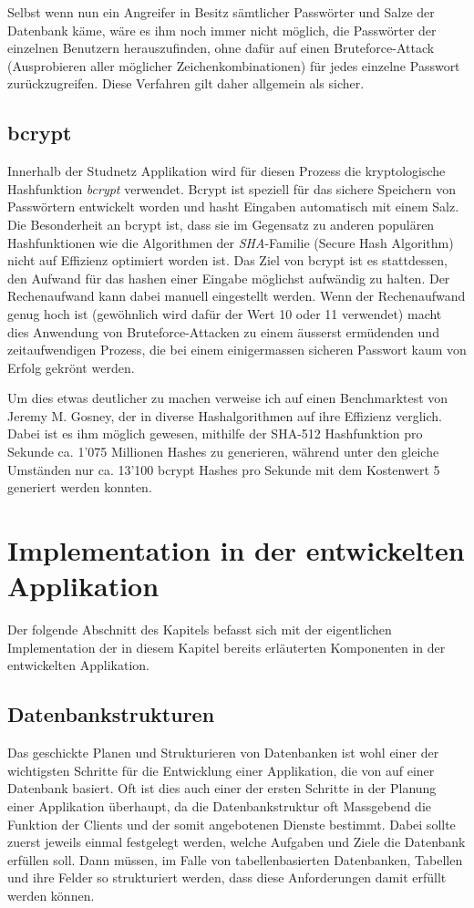 \documentclass[../main.tex]{subfiles}
\begin{document}
	Selbst wenn nun ein Angreifer in Besitz sämtlicher Passwörter und Salze der Datenbank käme, wäre es ihm noch immer nicht möglich, die Passwörter der einzelnen Benutzern herauszufinden, ohne dafür auf einen Bruteforce-Attack (Ausprobieren aller möglicher Zeichenkombinationen) für jedes einzelne Passwort zurückzugreifen. Diese Verfahren gilt daher allgemein als sicher. \cite{defuse} \cite{security}
	
	\subsection{bcrypt}
	Innerhalb der Studnetz Applikation wird für diesen Prozess die kryptologische Hashfunktion \emph{bcrypt} verwendet. Bcrypt ist speziell für das sichere Speichern von Passwörtern entwickelt worden und hasht Eingaben automatisch mit einem Salz. Die Besonderheit an bcrypt ist, dass sie im Gegensatz zu anderen populären Hashfunktionen wie die Algorithmen der \emph{SHA}-Familie (Secure Hash Algorithm) nicht auf Effizienz optimiert worden ist. Das Ziel von bcrypt ist es stattdessen, den Aufwand für das hashen einer Eingabe möglichst aufwändig zu halten. Der Rechenaufwand kann dabei manuell eingestellt werden. Wenn der Rechenaufwand genug hoch ist (gewöhnlich wird dafür der Wert 10 oder 11 verwendet) macht dies Anwendung von Bruteforce-Attacken zu einem äusserst ermüdenden und zeitaufwendigen Prozess, die bei einem einigermassen sicheren Passwort kaum von Erfolg gekrönt werden. \cite{bcrypt}
	
	Um dies etwas deutlicher zu machen verweise ich auf einen Benchmarktest von Jeremy M. Gosney, der in diverse Hashalgorithmen auf ihre Effizienz verglich. Dabei ist es ihm möglich gewesen, mithilfe der SHA-512 Hashfunktion pro Sekunde ca. 1'075 Millionen Hashes zu generieren, während unter den gleiche Umständen nur ca. 13'100 bcrypt Hashes pro Sekunde mit dem Kostenwert 5 generiert werden konnten. \cite{benchmark}
	
	\section{Implementation in der entwickelten Applikation}\label{implementationServer}
	Der folgende Abschnitt des Kapitels befasst sich mit der eigentlichen Implementation der in diesem Kapitel bereits erläuterten Komponenten in der entwickelten Applikation.
	
	\subsection{Datenbankstrukturen}
	Das geschickte Planen und Strukturieren von Datenbanken ist wohl einer der wichtigsten Schritte für die Entwicklung einer Applikation, die von auf einer Datenbank basiert. Oft ist dies auch einer der ersten Schritte in der Planung einer Applikation überhaupt, da die Datenbankstruktur oft Massgebend die Funktion der Clients und der somit angebotenen Dienste bestimmt. Dabei sollte zuerst jeweils einmal festgelegt werden, welche Aufgaben und Ziele die Datenbank erfüllen soll. Dann müssen, im Falle von tabellenbasierten Datenbanken, Tabellen und ihre Felder so strukturiert werden, dass diese Anforderungen damit erfüllt werden können. 
	
\end{document}
